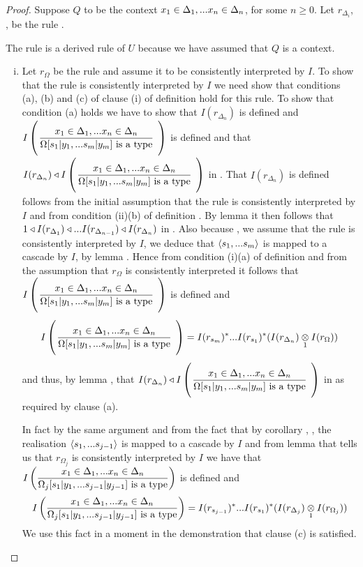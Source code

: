\begin{proof}
Suppose  $Q$ to be the context $x_1 \in \Delta_1,... x_{n} \in \Delta_{n}$, for some $n \geq 0$. Let $r_{\Delta_i}$, \foreachi, be the rule .

The rule  is a derived rule of $U$ because we have assumed that $Q$ is a context. 
\begin{enumerate}[(i)]
\item
\newcommand{\targetruleone}{\gatdisplayrule{\xDelta{n}}{\isT{\Omega[\SUBsFORy{m}]}}}
Let $r_\Omega$ be the rule \ZOmega and assume it to be consistently interpreted by $I$.
To show that the rule \ZOmegaSUBsmFORym is consistently interpreted by $I$ we need show that conditions (a), (b) and (c)
of clause (i) of definition  hold for this rule.
To  show  that condition (a) holds we have to show that $I(r_{\Delta_n})$ is defined 
and $\Imap{\targetruleone}$ is defined and that  $I(r_{\Delta_n}) \base \Imap{\targetruleone}$ in \catc. 
That $I(r_{\Delta_n})$ is defined follows from the initial assumption
that the rule  is consistently interpreted by $I$
and from condition (ii)(b) of definition . 
By  lemma  it then follows that 
$1 \triangleleft I(r_{\Delta_1}) \triangleleft ... I(r_{\Delta_{n-1}}) \triangleleft I(r_{\Delta_n})$ in \catc.
Also because \foreachj,  we assume that the rule  is consistently interpreted by $I$, 
we deduce that $\langle s_1,...s_{m}\rangle$ is mapped to a cascade by $I$, by lemma . Hence 
from condition (i)(a) of definition  and from the assumption that $r_\Omega$ is consistently interpreted it follows that $\Imap{\targetruleone}$ is defined and 
\begin{equation}
\label{omegaSubsmapping}
\Imap{\targetruleone} = I(r_{s_m})^*...I(r_{s_1})^*(\crossx{I(r_{\Delta_n})}{I(r_\Omega)}{1})
\end{equation}
and thus, by lemma , that $I(r_{\Delta_n}) \base \Imap{\targetruleone}$ in \catcw as required by clause (a).

In fact by the same argument and from the fact that by corollary , \foreachj,  
the realisation $\langle s_1,...s_{j-1}\rangle$ is mapped to a cascade by $I$ and from lemma  that tells us that 
$r_{\Omega_j}$ is consistently interpreted by $I$ we have that
$\displaystyle I\left(\frac{x_1 \in \Delta_1,... x_{n} \in \Delta_{n}}{\Omega_j[s_1|y_1,...s_{j-1}|y_{j-1}]\mbox{ is a type}}\right)$ is defined and 
\begin{equation}
\label{omegajSubsmapping}
\Imappedrule{\xDelta{n}}{\isT{\Omega_j[\SUBsFORy{j-1}]}} 
= I(r_{s_{j-1}})^*...I(r_{s_1})^*(\crossx{I(r_{\Delta_j})}{I(r_{\Omega_j})}{1})
\end{equation}
We use this fact in a moment in the demonstration that clause (c) is satisfied.


\end{enumerate}
\end{proof}
